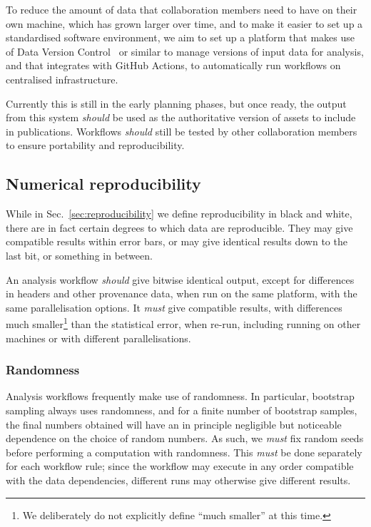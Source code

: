 \documentclass{article}
\newcommand\rfcword[1]{\emph{#1}\xspace}
\newcommand\must{\rfcword{must}}
\newcommand\should{\rfcword{should}}
\begin{document}
To reduce the amount of data that collaboration members need to have on their own machine,
which has grown larger over time,
and to make it easier to set up a standardised software environment,
we aim to set up a platform
that makes use of Data Version Control~\cite{dvc} or similar
to manage versions of input data for analysis,
and that integrates with GitHub Actions,
to automatically run workflows on centralised infrastructure.

Currently this is still in the early planning phases,
but once ready,
the output from this system \should be used as
the authoritative version of assets to include in publications.
Workflows \should still be tested by other collaboration members to ensure portability and reproducibility.


\subsection{Numerical reproducibility}\label{sec:numerical-repro}

While in Sec.~\ref{sec:reproducibility} we define reproducibility in black and white,
there are in fact certain degrees to which data are reproducible.
They may give compatible results within error bars,
or may give identical results down to the last bit,
or something in between.

An analysis workflow \should give bitwise identical output,
except for differences in headers and other provenance data,
when run on the same platform,
with the same parallelisation options.
It \must give compatible results,
with differences much smaller\footnote{
  We deliberately do not explicitly define ``much smaller'' at this time.
} than the statistical error,
when re-run,
including running on other machines or with different parallelisations.

\subsubsection{Randomness}

Analysis workflows frequently make use of randomness.
In particular,
bootstrap sampling always uses randomness,
and for a finite number of bootstrap samples,
the final numbers obtained will have
an in principle negligible but noticeable dependence on the choice of random numbers.
As such,
we \must fix random seeds before performing a computation with randomness.
This \must be done separately for each workflow rule;
since the workflow may execute in any order compatible with the data dependencies,
different runs may otherwise give different results.
\end{document}
